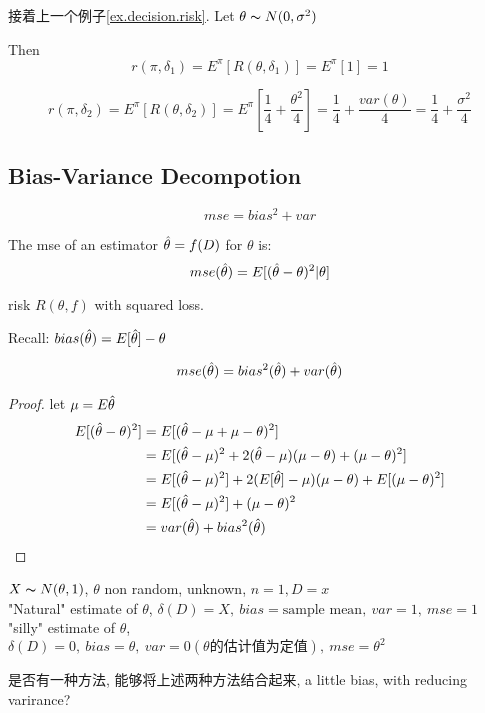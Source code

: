 \documentclass{article}
\begin{document}
\begin{example}
接着上一个例子\ref{ex.decision.risk}.
Let $\theta \thicksim{N}(0, \sigma^2)$

Then
$$r(\pi, \delta_1) = E^\pi[R(\theta, \delta_1)] = E^\pi[1] = 1$$

$$
r(\pi, \delta_2) = E^\pi[R(\theta, \delta_2)] = E^\pi[\dfrac{1}{4} + \dfrac{\theta^2}{4}]
= \dfrac{1}{4} + \dfrac{var(\theta)}{4}
= \dfrac{1}{4} + \dfrac{\sigma^2}{4}
$$
\end{example}

\subsection{Bias-Variance Decompotion}
$$mse = bias^2 + var$$
\begin{definition}
The mse of an estimator $\hat{\theta} = f(D)$ for $\theta$ is:
$$mse(\hat{\theta}) = E[(\hat{\theta} - \theta)^2 | \theta]$$
\end{definition}
risk $R(\theta, f)$ with squared loss.

Recall: $bias(\hat{\theta}) = E[\hat{\theta}] - \theta$

\begin{proposition}
$$mse(\hat{\theta} ) = bias^2(\hat{\theta} ) + var(\hat{\theta} )$$
\end{proposition}
\begin{proof}
let $\mu = E\hat{\theta} $
$$
\begin{aligned}
E[(\hat{\theta} - \theta )^2]
& = E[(\hat{\theta} - \mu + \mu - \theta )^2] \\
& = E[(\hat{\theta} - \mu)^2 +  2 (\hat{\theta} - \mu) (\mu - \theta) + (\mu - \theta)^2] \\
& = E[(\hat{\theta} - \mu)^2] +  2 (E[\hat{\theta}] - \mu) (\mu - \theta) + E[(\mu - \theta)^2] \\
& = E[(\hat{\theta} - \mu)^2] + (\mu - \theta)^2 \\
& = var(\hat{\theta}) + bias^2(\hat{\theta})
\end{aligned}
$$
\end{proof}

\begin{example}
$X \thicksim{N}(\theta, 1)$, $\theta$ non random, unknown, $n=1, D=x$\\
"Natural" estimate of $\theta$, $\delta(D) = X,\ bias = \text{sample mean},\ var = 1,\ mse = 1$\\
"silly" estimate of $\theta$, $\delta(D) = 0,\ bias = \theta,\ var = 0(\text{$\theta$的估计值为定值}),\ mse = \theta^2$

是否有一种方法, 能够将上述两种方法结合起来, a little bias, with reducing varirance?
\end{example}
\end{document}
